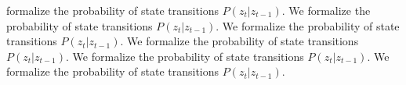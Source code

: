 formalize the probability of state transitions $P(z_t | z_{t-1})$. We formalize the probability of state transitions $P(z_t | z_{t-1})$. We formalize the probability of state transitions $P(z_t | z_{t-1})$. We formalize the probability of state transitions $P(z_t | z_{t-1})$. We formalize the probability of state transitions $P(z_t | z_{t-1})$. We formalize the probability of state transitions $P(z_t | z_{t-1})$. 

